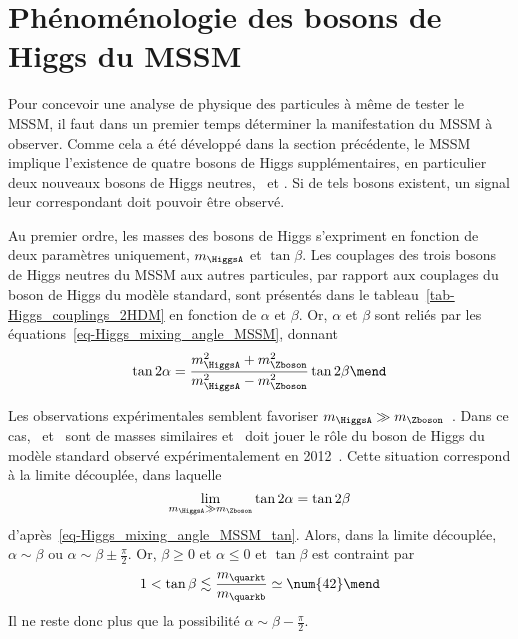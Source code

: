\section{Phénoménologie des bosons de Higgs du MSSM}\label{chapter-MS-MSSM-section-pheno_Higgs_MSSM}
Pour concevoir une analyse de physique des particules à même de tester le MSSM, il faut dans un premier temps déterminer la manifestation du MSSM à observer.
Comme cela a été développé dans la section précédente, le MSSM implique l'existence de quatre bosons de Higgs supplémentaires, en particulier deux nouveaux bosons de Higgs neutres, \Higgs\ et \HiggsA.
Si de tels bosons existent, un signal leur correspondant doit pouvoir être observé.
\par Au premier ordre, les masses des bosons de Higgs s'expriment en fonction de deux paramètres uniquement, $m_{\HiggsA}$ et $\tan\beta$.
Les couplages des trois bosons de Higgs neutres du MSSM aux autres particules, par rapport aux couplages du boson de Higgs du modèle standard, sont présentés dans le tableau~\ref{tab-Higgs_couplings_2HDM} en fonction de $\alpha$ et $\beta$.
Or, $\alpha$ et $\beta$ sont reliés par les équations~\eqref{eq-Higgs_mixing_angle_MSSM}, donnant
\begin{equation}
\tan 2\alpha = \frac{m_{\HiggsA}^2+m_{\Zboson}^2}{m_{\HiggsA}^2-m_{\Zboson}^2} \tan 2\beta
\mend
\label{eq-Higgs_mixing_angle_MSSM_tan}
\end{equation}
\par Les observations expérimentales semblent favoriser $m_{\HiggsA}\gg m_{\Zboson}$~\cite{ATLAS-CMS-Higgs_combined_1,ATLAS-CMS-Higgs_combined_2,CMS-MSSM-HTT_2014,CMS-PAS-HIG-17-020}.
Dans ce cas, \Higgs\ et \HiggsA\ sont de masses similaires et \higgs\ doit jouer le rôle du boson de Higgs du modèle standard observé expérimentalement en 2012~\cite{ATLAS_Higgs_discovery,CMS_Higgs_discovery,CMS_Higgs_discovery_2013}.
Cette situation correspond à la limite découplée, dans laquelle
\begin{equation}
\lim_{m_{\HiggsA}\gg m_{\Zboson}} \tan 2\alpha = \tan 2\beta
\end{equation}
d'après~\eqref{eq-Higgs_mixing_angle_MSSM_tan}.
Alors, dans la limite découplée, $\alpha \sim \beta$ ou $\alpha\sim\beta\pm\frac{\pi}{2}$.
Or, $\beta\geq0$ et $\alpha\leq0$ et $\tan\beta$ est contraint par~\cite{Ridolfi-SUSY}
\begin{equation}
1 < \tan\beta \lesssim \frac{m_{\quarkt}}{m_{\quarkb}} \simeq \num{42} \mend
\end{equation}
Il ne reste donc plus que la possibilité $\alpha\sim\beta-\frac{\pi}{2}$.
